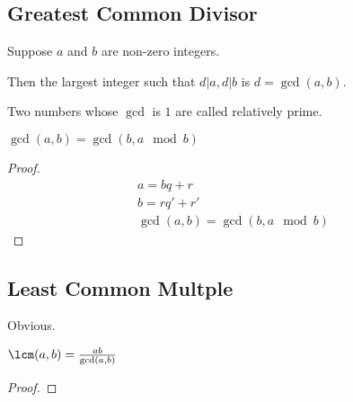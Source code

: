 \documentclass{scrreprt}
\begin{document}
\subsection{Greatest Common Divisor}

Suppose $a$ and $b$ are non-zero integers.

Then the largest integer such that $d|a, d|b$ is $d = \gcd(a, b)$.

Two numbers whose $\gcd$ is $1$ are called relatively prime.

\begin{theorem}
	$\gcd(a, b) = \gcd(b, a \mod b)$
	\begin{proof}
		\begin{align*}
			a = bq + r \\
			b = rq' + r' \\
			\gcd(a, b) = \gcd(b, a \mod b)
		\end{align*}
	\end{proof}
\end{theorem}

\subsection{Least Common Multple}

Obvious.

\begin{theorem}
	$\lcm(a, b) = \frac{ab}{\gcd(a, b)}$
	\begin{proof}
		
	\end{proof}
\end{theorem}
\end{document}
